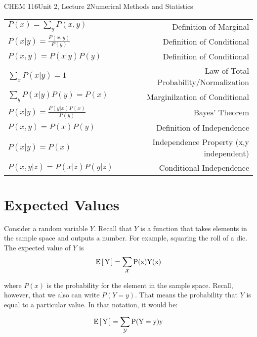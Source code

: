 \documentclass{article}
\begin{document}
\begin{tdoc}{CHEM 116}{Unit 2, Lecture 2}{Numerical Methods and Statistics}
  \begin{tabular}{lr}
    $P(x) = \sum_y P(x,y)$ & Definition of Marginal\vspace{0.15cm}\\
    $P(x|y) = \frac{P(x,y)}{P(y)}$ & Definition of Conditional\vspace{0.15cm}\\
    $P(x,y) = P(x|y)P(y)$ & Definition of Conditional\vspace{0.15cm}\\
    $\sum_x P(x|y) = 1$ & Law of Total Probability/Normalization\vspace{0.15cm}\\
    $\sum_y P(x|y)P(y) = P(x)$ & Marginilzation of Conditional\vspace{0.15cm}\\
    $P(x|y) = \frac{P(y|x)P(x)}{P(y)}$ & Bayes' Theorem\vspace{0.15cm}\\
    $P(x,y) = P(x)P(y)$ & Definition of Independence\vspace{0.15cm}\\
    $P(x | y) = P(x)$ & Independence Property (x,y independent)\vspace{0.15cm}\\
    $P(x,y | z) = P(x|z)P(y|z)$ & Conditional Independence\vspace{0.15cm}\\
  \end{tabular}



  \section{Expected Values}

 Consider a random variable $Y$. Recall that $Y$ is a function that
 takes elements in the sample space and outputs a number. For example,
 squaring the roll of a die. The expected value of $Y$ is 
\begin{equation}
\rm{E}\left[\,Y\,\right] = \sum_\mathcal{X} P(x)Y(x)
\end{equation}

where $P(x)$ is the probability for the element in the sample
space. Recall, however, that we also can write $P(Y = y)$. That means
the probability that $Y$ is equal to a particular value. In that
notation, it would be:

\begin{equation}
\rm{E}\left[\,Y\,\right] = \sum_\mathcal{Y} P(Y=y)y
\end{equation}


\end{tdoc}
\end{document}
